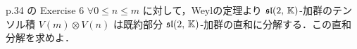 \documentclass{ltjsarticle}
\makeatletter
\theoremstyle{mystyle} %
\renewcommand{\proofname}{証明}
\renewenvironment{proof}[1][\proofname]{\par
    \pushQED{\qed}%
    \normalfont \topsep6\p@\@plus6\p@\relax
    \trivlist
    \item[\hskip\labelsep
        \itshape
    \textbf{\underline{#1}}]\ignorespaces
}{%
    \popQED\endtrivlist\@endpefalse
}
\numberwithin{equation}{section}
\newcommand{\btr}{\blacktriangleright}
\makeatother
\begin{document}
\begin{myproblem}[label=ex:2-7-6]{p.34 の Exercise 6}
    $\forall 0 \le n \le m$ に対して，Weylの定理より
    $\mathfrak{sl}(2,\, \mathbb{K})$-加群のテンソル積 $V(m) \otimes V(n)$ は既約部分 $\mathfrak{sl}(2,\, \mathbb{K})$-加群の直和に分解する．この直和分解を求めよ．
\end{myproblem}

    

    
\end{document}
